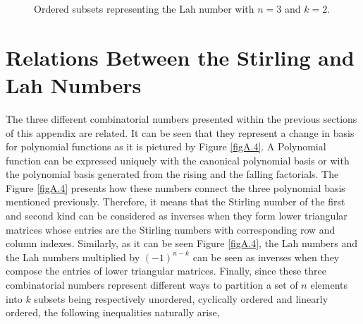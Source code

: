 \begin{figure}[!htbp]
\centering
{}
\caption{Ordered subsets representing the Lah number with $n=3$ and $k=2$.}
\label{figA.3}
\end{figure}

\section{Relations Between the Stirling and Lah Numbers}

The three different combinatorial numbers presented within the previous sections of this appendix are related. It can be seen that they represent a change in basis for polynomial functions as it is pictured by Figure \ref{figA.4}. A Polynomial function can be expressed uniquely with the canonical polynomial basis or with the polynomial basis generated from the rising and the falling factorials. The Figure \ref{figA.4} presents how these numbers connect the three polynomial basis mentioned previously. Therefore, it means that the Stirling number of the first and second kind can be considered as inverses when they form lower triangular matrices whose entries are the Stirling numbers with corresponding row and column indexes. Similarly, as it can be seen Figure \ref{figA.4}, the Lah numbers and the Lah numbers multiplied by $(-1)^{n-k}$ can be seen as inverses when they compose the entries of lower triangular matrices. Finally, since these three combinatorial numbers represent different ways to partition a set of $n$ elements into $k$ subsets being respectively unordered, cyclically ordered and linearly ordered, the following inequalities naturally arise,


